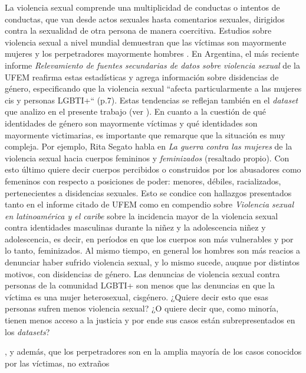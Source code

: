 \documentclass[10 pt]{article}
\begin{document}
La violencia sexual comprende una multiplicidad de conductas o intentos de conductas, que van desde actos sexuales hasta comentarios sexuales, dirigidos contra la sexualidad de otra persona de manera coercitiva. Estudios sobre violencia sexual a nivel mundial demuestran que las víctimas son mayormente mujeres y los perpetradores mayormente hombres \citetext{\citealp[p.~149]{ferris2002world}; \citealp[p.~15]{contreras2016violencia}}. En Argentina, el más reciente informe \textit{Relevamiento de fuentes secundarias de datos sobre violencia sexual} de la UFEM \citep*{ufem_relevamiento} reafirma estas estadísticas y agrega información sobre disidencias de género, especificando que la violencia sexual “afecta particularmente a las mujeres cis y personas LGBTI+“ (p.7). Estas tendencias se reflejan también en el \textit{dataset} que analizo en el presente trabajo (ver ). En cuanto a la cuestión de qué identidades de género son mayormente víctimas y qué identidades son mayormente victimarias, es importante que remarque que la situación es muy compleja. Por ejemplo, Rita Segato habla en \textit{La guerra contra las mujeres} \citep*{segato2016guerra} de la violencia sexual hacia cuerpos femininos y \textit{feminizados} (resaltado propio). Con esto último quiere decir cuerpos percibidos o construidos por los abusadores como femeninos con respecto a posiciones de poder: menores, débiles, racializados, pertenecientes a disidencias sexuales. Esto se condice con hallazgos presentados tanto en el informe citado de UFEM como en compendio sobre \textit{Violencia sexual en latinoamérica y el caribe} \citep*{contreras2016violencia} sobre la incidencia mayor de la violencia sexual contra identidades masculinas durante la niñez y la adolescencia niñez y adolescencia, es decir, en períodos en que los cuerpos son más vulnerables y por lo tanto, feminizados. Al mismo tiempo, en general los hombres son más reacios a denunciar haber sufrido violencia sexual, y lo mismo sucede, auqnue por distintos motivos, con disidencias de género. Las denuncias de violencia sexual contra personas de la comunidad LGBTI+ son menos que las denuncias en que la víctima es una mujer heterosexual, cisgénero. ¿Quiere decir esto que esas personas sufren menos violencia sexual? ¿O quiere decir que, como minoría, tienen menos acceso a la justicia y por ende sus casos están subrepresentados en los \textit{datasets}?   

, y además, que los perpetradores son en la amplia mayoría de los casos conocidos por las víctimas, no extraños
\end{document}
